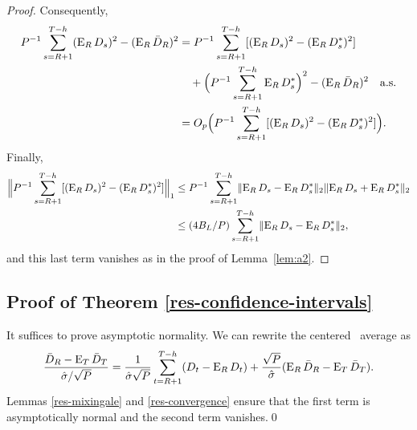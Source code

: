 \documentclass[11pt]{article}
\begin{document}
\begin{proof}
Consequently,
\begin{align*}
P^{-1} \sum_{s=R+1}^{T-h} (\operatorname{E}_R D_s)^2 - (\operatorname{E}_R\bar{D}_{R})^2 & =
P^{-1} \sum_{s=R+1}^{T-h} [(\operatorname{E}_R D_s)^2 - (\operatorname{E}_R D_s^*)^2]\\
&\quad+ \Big(P^{-1} \sum_{s=R+1}^{T-h} \operatorname{E}_R D_s^*\Big)^2 - (\operatorname{E}_R\bar{D}_{R})^2 \quad \text{a.s}.\\
&= O_p\Big(P^{-1} \sum_{s=R+1}^{T-h} [(\operatorname{E}_R D_s)^2 - (\operatorname{E}_R D_s^*)^2]\Big).
\end{align*}
Finally,
\begin{align*}
\Big\lVert P^{-1} \sum_{s=R+1}^{T-h} [(\operatorname{E}_RD_s)^2 - (\operatorname{E}_R D_s^*)^2] \Big\rVert_1
&\leq P^{-1} \sum_{s=R+1}^{T-h} \lVert \operatorname{E}_RD_s - \operatorname{E}_R D_s^* \rVert_2 \lVert
\operatorname{E}_RD_s + \operatorname{E}_R D_s^* \rVert_2
\\ &\leq (4 B_L/P) \sum_{s=R+1}^{T-h} \lVert \operatorname{E}_RD_s - \operatorname{E}_R D_s^* \rVert_2,
\end{align*}
and this last term vanishes as in the proof of Lemma~\ref{lem:a2}.
\end{proof}

\subsection*{Proof of Theorem \ref{res-confidence-intervals}}

It suffices to prove asymptotic normality.  We can rewrite the
centered \oos\ average as
\[
\frac{\bar{D}_{R} - \operatorname{E}_T \bar{D}_T}{\hat{\sigma} / \sqrt{P}} =
\frac{1}{\hat{\sigma} \sqrt{P}}\sum_{t=R+1}^{T-h} (D_t - \operatorname{E}_R D_t) +
\frac{\sqrt{P}}{\hat{\sigma}} (\operatorname{E}_R\bar{D}_{R} - \operatorname{E}_T\bar{D}_{T}).
\]
Lemmas \ref{res-mixingale} and
\ref{res-convergence} ensure that the first term is asymptotically
normal and the second term vanishes.\qed
\end{document}
